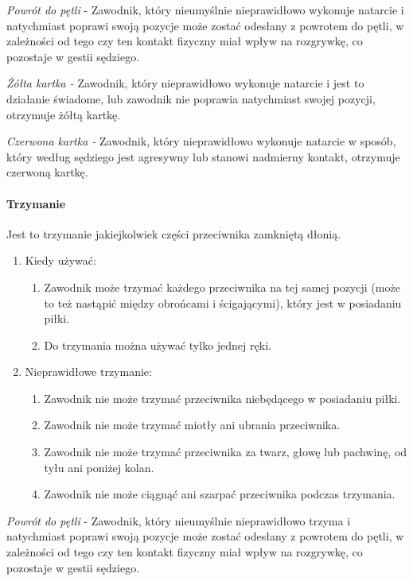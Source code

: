 \documentclass[12pt]{article}
\begin{document}
\emph{Powrót do pętli} - Zawodnik, który nieumyślnie nieprawidłowo
wykonuje natarcie i natychmiast poprawi swoją pozycje może zostać
odesłany z powrotem do pętli, w zależności od tego czy ten kontakt
fizyczny miał wpływ na rozgrywkę, co pozostaje w gestii sędziego.

\emph{Żółta kartka -} Zawodnik, który nieprawidłowo wykonuje natarcie i
jest to działanie świadome, lub zawodnik nie poprawia natychmiast swojej
pozycji, otrzymuje żółtą kartkę.

\emph{Czerwona kartka -} Zawodnik, który nieprawidłowo wykonuje natarcie
w sposób, który według sędziego jest agresywny lub stanowi nadmierny
kontakt, otrzymuje czerwoną kartkę.

\paragraph{Trzymanie}
Jest to trzymanie jakiejkolwiek części
przeciwnika zamkniętą dłonią.

\begin{enumerate}
\item
    Kiedy używać:
  
  \begin{enumerate}
  \item Zawodnik może trzymać każdego przeciwnika na tej samej pozycji
    (może to też nastąpić między obrońcami i ścigającymi), który jest w
    posiadaniu piłki.
      \item
        Do trzymania można używać tylko jednej ręki.
      \end{enumerate}
\item
    Nieprawidłowe trzymanie:
  
  \begin{enumerate}
  \item
        Zawodnik nie może trzymać przeciwnika niebędącego w posiadaniu
    piłki.
      \item
        Zawodnik nie może trzymać miotły ani ubrania przeciwnika.
      \item
        Zawodnik nie może trzymać przeciwnika za twarz, głowę lub pachwinę,
    od tyłu ani poniżej kolan.
      \item Zawodnik nie może ciągnąć ani szarpać przeciwnika podczas
    trzymania.
      \end{enumerate}
\end{enumerate}

\emph{Powrót do pętli} - Zawodnik, który nieumyślnie nieprawidłowo
trzyma i natychmiast poprawi swoją pozycje może zostać odesłany z
powrotem do pętli, w zależności od tego czy ten kontakt fizyczny miał
wpływ na rozgrywkę, co pozostaje w gestii sędziego.
\end{document}
